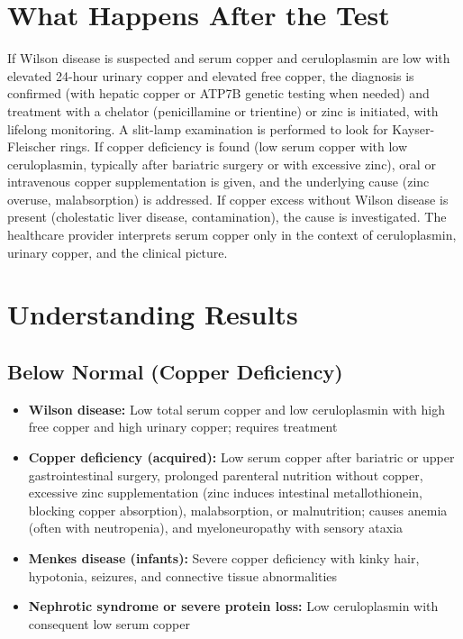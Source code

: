 \section*{What Happens After the Test}
If Wilson disease is suspected and serum copper and ceruloplasmin are low with elevated 24-hour urinary copper and elevated free copper, the diagnosis is confirmed (with hepatic copper or ATP7B genetic testing when needed) and treatment with a chelator (penicillamine or trientine) or zinc is initiated, with lifelong monitoring. A slit-lamp examination is performed to look for Kayser-Fleischer rings. If copper deficiency is found (low serum copper with low ceruloplasmin, typically after bariatric surgery or with excessive zinc), oral or intravenous copper supplementation is given, and the underlying cause (zinc overuse, malabsorption) is addressed. If copper excess without Wilson disease is present (cholestatic liver disease, contamination), the cause is investigated. The healthcare provider interprets serum copper only in the context of ceruloplasmin, urinary copper, and the clinical picture.

\section*{Understanding Results}

\subsection*{Below Normal (Copper Deficiency)}
\begin{itemize}
  \item \textbf{Wilson disease:} Low total serum copper and low ceruloplasmin with high free copper and high urinary copper; requires treatment
  \item \textbf{Copper deficiency (acquired):} Low serum copper after bariatric or upper gastrointestinal surgery, prolonged parenteral nutrition without copper, excessive zinc supplementation (zinc induces intestinal metallothionein, blocking copper absorption), malabsorption, or malnutrition; causes anemia (often with neutropenia), and myeloneuropathy with sensory ataxia
  \item \textbf{Menkes disease (infants):} Severe copper deficiency with kinky hair, hypotonia, seizures, and connective tissue abnormalities
  \item \textbf{Nephrotic syndrome or severe protein loss:} Low ceruloplasmin with consequent low serum copper
\end{itemize}

